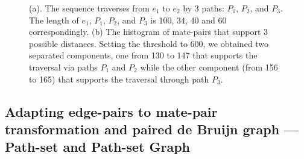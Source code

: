 \documentclass[12pt,a4paper,oneside]{article}
\begin{document}
\begin{figure}
    \begin{center}
    \caption{(a). The sequence traverses from $e_1$ to $e_2$ by 3 paths: $P_1$, $P_2$, and $P_3$. The length of $e_1$, $P_1$, $P_2$, and $P_3$ is 100, 34, 40 and 60 correspondingly. 
    (b) The histogram of mate-pairs that support 3 possible distances. Setting the threshold to 600, we obtained two separated components, one from 130 to 147 that supports 
    the traversal via paths $P_1$ and $P_2$ while the other component (from 156 to 165) that supports the traversal through path $P_3$.}
    \end{center}
\end{figure}


\subsection{Adapting edge-pairs to mate-pair transformation and paired de Bruijn graph --- Path-set and Path-set Graph}
\end{document}
